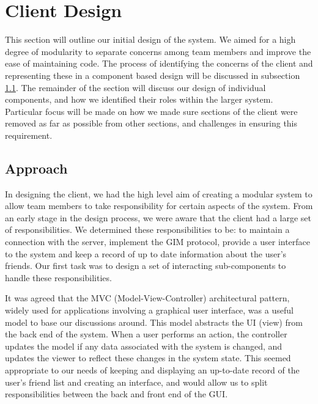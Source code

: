 \section{Client Design}
\label{client_design}

This section will outline our initial design of the system. We aimed for a high degree of modularity to separate concerns among team members and improve the ease of maintaining code. The process of identifying the concerns of the client and representing these in a component based design will be discussed in subsection \ref{client_approach}. The remainder of the section will discuss our design of individual components, and how we identified their roles within the larger system. Particular focus will be made on how we made sure sections of the client were removed as far as possible from other sections, and challenges in ensuring this requirement. 

\subsection{Approach}
\label{client_approach}

In designing the client, we had the high level aim of creating a modular system to allow team members to take responsibility for certain aspects of the system. From an early stage in the design process, we were aware that the client had a large set of responsibilities. We determined these responsibilities to be: to maintain a connection with the server, implement the GIM protocol, provide a user interface to the system and keep a record of up to date information about the user's friends. Our first task was to design a set of interacting sub-components to handle these responsibilities.

It was agreed that the MVC (Model-View-Controller) architectural pattern, widely used for applications involving a graphical user interface, was a useful model to base our discussions around. This model abstracts the UI (view) from the back end of the system. When a user performs an action, the controller updates the model if any data associated with the system is changed, and updates the viewer to reflect these changes in the system state. This seemed appropriate to our needs of keeping and displaying an up-to-date record of the user's friend list and creating an interface, and would allow us to split responsibilities between the back and front end of the GUI.

